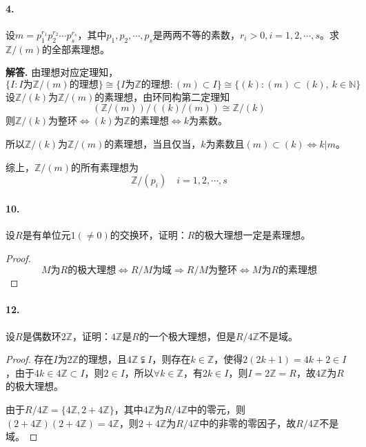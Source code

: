 \documentclass[12pt, a4paper, oneside]{ctexart}
\newenvironment{solution}{\par\noindent\textbf{解答. }}{\bigskip\par}
\begin{document}
\paragraph{4.} 设$m=p_1^{r_1}p_2^{r_2}\cdots p_s^{r_s}$，其中$p_1,p_2,\cdots,p_s$是两两不等的素数，$r_i>0,i=1,2,\cdots,s$。求$\mathbb{Z}/(m)$的全部素理想。
\begin{solution}
    由理想对应定理知，
    \begin{equation*}
        \{I:I\text{为}\mathbb{Z}/(m)\text{的理想}\}\cong\{I\text{为}\mathbb{Z}\text{的理想}:(m)\subset I\}\cong\{(k):(m)\subset (k),\ k\in\mathbb{N}\}
    \end{equation*}
    设$\mathbb{Z}/(k)$为$\mathbb{Z}/(m)$的素理想，由环同构第二定理知
    \begin{equation*}
        (\mathbb{Z}/(m))/((k)/(m))\cong \mathbb{Z}/(k)
    \end{equation*}
    则$\mathbb{Z}/(k)$为整环$\iff$$(k)$为$\mathbb{Z}$的素理想$\iff$$k$为素数。

    所以$\mathbb{Z}/(k)$为$\mathbb{Z}/(m)$的素理想，当且仅当，$k$为素数且$(m)\subset (k)\iff k|m$。

    综上，$\mathbb{Z}/(m)$的所有素理想为
    \begin{equation*}
        \mathbb{Z}/(p_i)\quad i=1,2,\cdots,s
    \end{equation*}
\end{solution}
\paragraph{10.}设$R$是有单位元$1(\neq 0)$的交换环，证明：$R$的极大理想一定是素理想。
\begin{proof}
    \begin{equation*}
        M\text{为}R\text{的极大理想}\iff R/M\text{为域}\Rightarrow R/M\text{为整环}\iff M\text{为}R\text{的素理想}
    \end{equation*}
\end{proof}
\paragraph{12.}设$R$是偶数环$2\mathbb{Z}$，证明：$4\mathbb{Z}$是$R$的一个极大理想，但是$R/4\mathbb{Z}$不是域。
\begin{proof}
    存在$I$为$2\mathbb{Z}$的理想，且$4\mathbb{Z}\subsetneqq I$，则存在$k\in \mathbb{Z}$，使得$2 (2k+1)=4k+2\in I$，由于$4k\in4\mathbb{Z}\subset I$，则$2\in I$，所以$\forall k\in \mathbb{Z}$，有$2k\in I$，则$I= 2\mathbb{Z} = R$，故$4\mathbb{Z}$为$R$的极大理想。

    由于$R/4\mathbb{Z} = \{4\mathbb{Z},2+4\mathbb{Z}\}$，其中$4\mathbb{Z}$为$R/4\mathbb{Z}$中的零元，则$(2+4\mathbb{Z})(2+4\mathbb{Z}) = 4\mathbb{Z}$，则$2+4\mathbb{Z}$为$R/4\mathbb{Z}$中的非零的零因子，故$R/4\mathbb{Z}$不是域。
\end{proof}
\end{document}
